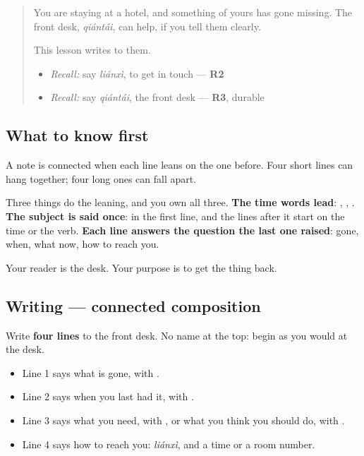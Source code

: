 \label{lesson:ZH-W285-a-note}



\begin{quote}
You are staying at a hotel, and something of yours has gone missing. The front desk, \emph{qiántái}, can help, if you tell them clearly.

This lesson writes to them.

\begin{itemize}
\raggedright
  \item \emph{Recall:} say \emph{liánxì}, to get in touch — \textbf{R2}
  \item \emph{Recall:} say \emph{qiántái}, the front desk — \textbf{R3}, durable
\end{itemize}
\end{quote}

\subsection*{What to know first}
A note is connected when each line leans on the one before. Four short lines can hang together; four long ones can fall apart.

Three things do the leaning, and you own all three. \textbf{The time words lead}: , , . \textbf{The subject is said once}:  in the first line, and the lines after it start on the time or the verb. \textbf{Each line answers the question the last one raised}: gone, when, what now, how to reach you.

Your reader is the desk. Your purpose is to get the thing back.

\subsection*{Writing — connected composition}
Write \textbf{four lines} to the front desk. No name at the top: begin as you would at the desk.

\begin{itemize}
\raggedright
  \item Line 1 says what is gone, with .
  \item Line 2 says when you last had it, with .
  \item Line 3 says what you need, with , or what you think you should do, with .
  \item Line 4 says how to reach you: \emph{liánxì}, and a time or a room number.
\end{itemize}

